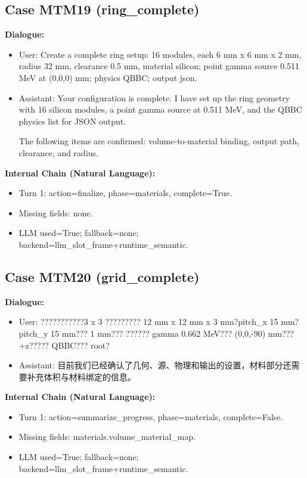 \documentclass[11pt]{ctexart}
\begin{document}
\subsection{Case MTM19 (ring\_complete)}
\textbf{Dialogue:}
\begin{itemize}
\item User: Create a complete ring setup: 16 modules, each 6 mm x 6 mm x 2 mm, radius 32 mm, clearance 0.5 mm, material silicon; point gamma source 0.511 MeV at (0,0,0) mm; physics QBBC; output json.
\item Assistant: Your configuration is complete. I have set up the ring geometry with 16 silicon modules, a point gamma source at 0.511 MeV, and the QBBC physics list for JSON output.

The following items are confirmed: volume-to-material binding, output path, clearance, and radius.
\end{itemize}
\textbf{Internal Chain (Natural Language):}
\begin{itemize}
\item Turn 1: action=finalize, phase=materials, complete=True.
\item Missing fields: none.
\item LLM used=True; fallback=none; backend=llm\_slot\_frame+runtime\_semantic.
\end{itemize}
\subsection{Case MTM20 (grid\_complete)}
\textbf{Dialogue:}
\begin{itemize}
\item User: ???????????3 x 3 ????????? 12 mm x 12 mm x 3 mm?pitch\_x 15 mm?pitch\_y 15 mm??? 1 mm??? ?????? gamma 0.662 MeV??? (0,0,-90) mm??? +z????? QBBC??? root?
\item Assistant: 目前我们已经确认了几何、源、物理和输出的设置，材料部分还需要补充体积与材料绑定的信息。
\end{itemize}
\textbf{Internal Chain (Natural Language):}
\begin{itemize}
\item Turn 1: action=summarize\_progress, phase=materials, complete=False.
\item Missing fields: materials.volume\_material\_map.
\item LLM used=True; fallback=none; backend=llm\_slot\_frame+runtime\_semantic.
\end{itemize}
\end{document}
